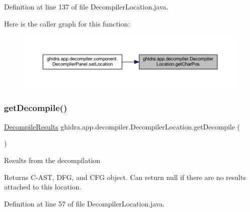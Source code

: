 Definition at line 137 of file Decompiler\+Location.\+java.

Here is the caller graph for this function\+:
\nopagebreak
\begin{figure}[H]
\begin{center}
\leavevmode
\includegraphics[width=350pt]{classghidra_1_1app_1_1decompiler_1_1_decompiler_location_ab30766b927c5c6a8a6b4ef2423d488a0_icgraph}
\end{center}
\end{figure}
\mbox{\label{classghidra_1_1app_1_1decompiler_1_1_decompiler_location_ad04db77f7ed6998fdc1f48de29225d61}} 
\subsubsection{\texorpdfstring{getDecompile()}{getDecompile()}}
{\footnotesize\ttfamily \mbox{\hyperlink{classghidra_1_1app_1_1decompiler_1_1_decompile_results}{Decompile\+Results}} ghidra.\+app.\+decompiler.\+Decompiler\+Location.\+get\+Decompile (\begin{DoxyParamCaption}{ }\end{DoxyParamCaption})\hspace{0.3cm}{\ttfamily [inline]}}

Results from the decompilation

\begin{DoxyReturn}{Returns}
C-\/\+A\+ST, D\+FG, and C\+FG object. Can return null if there are no results attached to this location. 
\end{DoxyReturn}


Definition at line 57 of file Decompiler\+Location.\+java.

\mbox{\label{classghidra_1_1app_1_1decompiler_1_1_decompiler_location_a4e664b7c1bb1def0c4a6d0eeed85b5fc}} 
